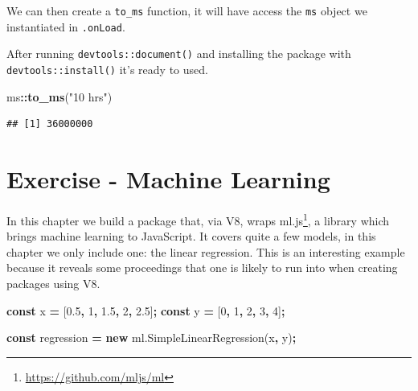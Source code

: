 \documentclass[
]{krantz}
\makeatletter
\newenvironment{Shaded}{\begin{snugshade}}{\end{snugshade}}
\newcommand{\AttributeTok}[1]{\textcolor[rgb]{0.61,0.61,0.61}{#1}}
\newcommand{\CommentTok}[1]{\textcolor[rgb]{0.37,0.37,0.37}{\textit{#1}}}
\newcommand{\ControlFlowTok}[1]{\textcolor[rgb]{0.27,0.27,0.27}{\textbf{#1}}}
\newcommand{\DecValTok}[1]{\textcolor[rgb]{0.06,0.06,0.06}{#1}}
\newcommand{\FloatTok}[1]{\textcolor[rgb]{0.06,0.06,0.06}{#1}}
\newcommand{\KeywordTok}[1]{\textcolor[rgb]{0.27,0.27,0.27}{\textbf{#1}}}
\newcommand{\NormalTok}[1]{#1}
\newcommand{\OperatorTok}[1]{\textcolor[rgb]{0.43,0.43,0.43}{\textbf{#1}}}
\newcommand{\StringTok}[1]{\textcolor[rgb]{0.5,0.5,0.5}{#1}}
\newcommand{\VariableTok}[1]{\textcolor[rgb]{0,0,0}{#1}}
\renewcommand{\href}[2]{#2\footnote{\url{#1}}}
\newenvironment{kframe}{%
\medskip{}
\setlength{\fboxsep}{.8em}
 \def\at@end@of@kframe{}%
 \ifinner\ifhmode%
  \def\at@end@of@kframe{\end{minipage}}%
  \begin{minipage}{\columnwidth}%
 \fi\fi%
 \def\FrameCommand##1{\hskip\@totalleftmargin \hskip-\fboxsep
 \colorbox{shadecolor}{##1}\hskip-\fboxsep
     \hskip-\linewidth \hskip-\@totalleftmargin \hskip\columnwidth}%
 \MakeFramed {\advance\hsize-\width
   \@totalleftmargin\z@ \linewidth\hsize
   \@setminipage}}%
 {\par\unskip\endMakeFramed%
 \at@end@of@kframe}
\renewenvironment{Shaded}{\begin{kframe}}{\end{kframe}}
\makeatother
\begin{document}
We can then create a \texttt{to\_ms} function, it will have access the \texttt{ms} object we instantiated in \texttt{.onLoad}.

\begin{Shaded}
\end{Shaded}

After running \texttt{devtools::document()} and installing the package with \texttt{devtools::install()} it's ready to used.

\begin{Shaded}
\begin{Highlighting}[]
\NormalTok{ms}\OperatorTok{::}\KeywordTok{to\_ms}\NormalTok{(}\StringTok{"10 hrs"}\NormalTok{)}
\end{Highlighting}
\end{Shaded}

\begin{verbatim}
## [1] 36000000
\end{verbatim}

\hypertarget{exercise---machine-learning}{%
\chapter{Exercise - Machine Learning}\label{exercise---machine-learning}}

In this chapter we build a package that, via V8, wraps \href{https://github.com/mljs/ml}{ml.js}, a library which brings machine learning to JavaScript. It covers quite a few models, in this chapter we only include one: the linear regression. This is an interesting example because it reveals some proceedings that one is likely to run into when creating packages using V8.

\begin{Shaded}
\begin{Highlighting}[]
\KeywordTok{const}\NormalTok{ x }\OperatorTok{=}\NormalTok{ [}\FloatTok{0.5}\OperatorTok{,} \DecValTok{1}\OperatorTok{,} \FloatTok{1.5}\OperatorTok{,} \DecValTok{2}\OperatorTok{,} \FloatTok{2.5}\NormalTok{]}\OperatorTok{;}
\KeywordTok{const}\NormalTok{ y }\OperatorTok{=}\NormalTok{ [}\DecValTok{0}\OperatorTok{,} \DecValTok{1}\OperatorTok{,} \DecValTok{2}\OperatorTok{,} \DecValTok{3}\OperatorTok{,} \DecValTok{4}\NormalTok{]}\OperatorTok{;}

\KeywordTok{const}\NormalTok{ regression }\OperatorTok{=} \KeywordTok{new} \VariableTok{ml}\NormalTok{.}\AttributeTok{SimpleLinearRegression}\NormalTok{(x}\OperatorTok{,}\NormalTok{ y)}\OperatorTok{;}
\end{Highlighting}
\end{Shaded}
\end{document}

